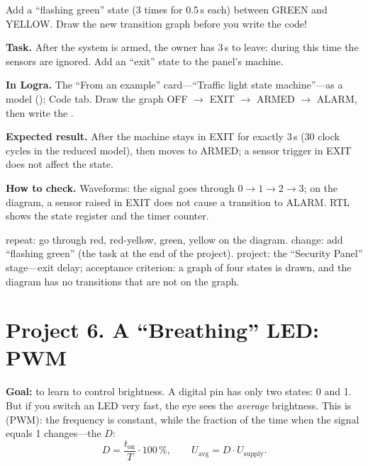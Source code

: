 \begin{taskbox}
Add a ``flashing green'' state (3 times for 0.5\,s each) between GREEN and
YELLOW. Draw the new transition graph before you write the code!
\end{taskbox}

\begin{diybox}
\textbf{Task.} After the system is armed, the owner has 3\,s to leave: during this time the sensors are ignored. Add an ``exit'' state to the panel's machine.

\textbf{In Logra.} The ``From an example'' card---``Traffic light state machine''---as a model (); Code tab. Draw the graph OFF $\to$ EXIT $\to$ ARMED $\to$ ALARM, then write the .

\textbf{Expected result.} After  the machine stays in EXIT for exactly 3\,s (30 clock cycles in the reduced model), then moves to ARMED; a sensor trigger in EXIT does not affect the state.

\textbf{How to check.} Waveforms: the  signal goes through $0\to 1\to 2\to 3$; on the diagram, a sensor raised in EXIT does not cause a transition to ALARM. RTL shows the state register and the timer counter.

 repeat: go through red, red-yellow, green, yellow on the diagram.  change: add ``flashing green'' (the task at the end of the project).  project: the ``Security Panel'' stage---exit delay; acceptance criterion: a graph of four states is drawn, and the diagram has no transitions that are not on the graph.
\end{diybox}

\section{Project 6. A ``Breathing'' LED: PWM}

\textbf{Goal:} to learn to control brightness. A digital pin has only two
states: 0 and 1. But if you switch an LED very fast, the eye sees the
\emph{average} brightness. This is  (PWM):
the frequency is constant, while the fraction of the time when the signal equals 1 changes---the
 $D$:
\[
  D = \frac{t_\text{on}}{T}\cdot 100\,\%, \qquad
  U_\text{avg} = D \cdot U_\text{supply}.
\]

